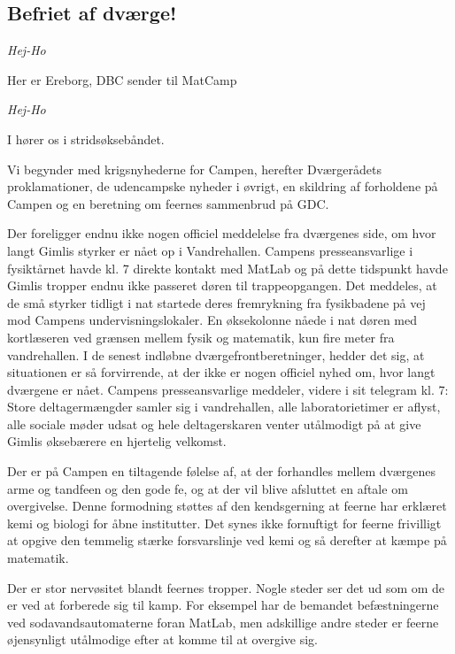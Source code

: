 \begin{minipage}[t]{170mm}
\vspace{3mm}
\begin{center}
\section*{Befriet af dværge!}
\emph{Hej-Ho}
\end{center}

Her er Ereborg, DBC sender til MatCamp 

\begin{center}
\emph{Hej-Ho}
\end{center}

I hører os i stridsøksebåndet. 

Vi begynder med krigsnyhederne for Campen, herefter Dværgerådets proklamationer, de udencampske nyheder i øvrigt, en skildring af forholdene på Campen og en beretning om feernes sammenbrud på GDC.

Der foreligger endnu ikke nogen officiel meddelelse fra dværgenes side, om hvor langt Gimlis styrker er nået op i Vandrehallen. Campens presseansvarlige i fysiktårnet havde kl. 7 direkte kontakt med MatLab og på dette tidspunkt havde Gimlis tropper endnu ikke passeret døren til trappeopgangen. Det meddeles, at de små styrker tidligt i nat startede deres fremrykning fra fysikbadene på vej mod Campens undervisningslokaler. En øksekolonne nåede i nat døren med kortlæseren ved grænsen mellem fysik og matematik, kun fire meter fra vandrehallen. I de senest indløbne dværgefrontberetninger, hedder det sig, at situationen er så forvirrende, at der ikke er nogen officiel nyhed om, hvor langt dværgene er nået. Campens presseansvarlige meddeler, videre i sit telegram kl. 7: Store deltagermængder samler sig i vandrehallen, alle laboratorietimer er aflyst, alle sociale møder udsat og hele deltagerskaren venter utålmodigt på at give Gimlis øksebærere en hjertelig velkomst.

Der er på Campen en tiltagende følelse af, at der forhandles mellem dværgenes arme og tandfeen og den gode fe, og at der vil blive afsluttet en aftale om overgivelse. Denne formodning støttes af den kendsgerning at feerne har erklæret kemi og biologi for åbne institutter. Det synes ikke fornuftigt for feerne frivilligt at opgive den temmelig stærke forsvarslinje ved kemi og så derefter at kæmpe på matematik.

Der er stor nervøsitet blandt feernes tropper. Nogle steder ser det ud som om de er ved at forberede sig til kamp. For eksempel har de bemandet befæstningerne ved sodavandsautomaterne foran MatLab, men adskillige andre steder er feerne øjensynligt utålmodige efter at komme til at overgive sig. 


\end{minipage}
